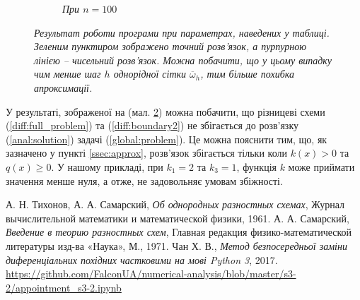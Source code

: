\begin{figure}[h!]
\begin{subfigure}{.5\textwidth}
  \caption{\it При \(n = 100\)}
  \label{fig:sub2}
\end{subfigure}
\caption{{\it Результат роботи програми \cite{SourceCode} при параметрах, наведених у таблиці. Зеленим пунктиром зображено точний розв'язок, а пурпурною лінією -- чисельний розв'язок. Можна побачити, що у цьому випадку чим менше шаг \(h\) однорідної сітки \( \overline{\omega}_h\), тим більше похибка апроксимації.}}
\label{fig:res2}
\end{figure}

У результаті, зображеної на (мал. \ref{fig:res2}) можна побачити, що різницеві схеми (\ref{diff:full_problem}) та (\ref{diff:boundary2}) не збігається до розв'язку (\ref{anal:solution}) задачі (\ref{global:problem}). Це можна пояснити тим, що, як зазначено у пункті \ref{ssec:approx}, розв'язок збігається тільки коли \( k(x) > 0\) та \(q(x) \geq 0\). У нашому прикладі, при \( k_1 = 2\) та  \( k_3 = 1\), функція \(k\) може приймати значення менше нуля, а отже, не задовольняє умовам збіжності.

\begin{thebibliography}{9}

  А. Н. Тихонов, А. А. Самарский,
  \emph{Об однородных разностных схемах},
  Журнал вычислительной математики и математической физики, 1961.
  А. А. Самарский,
  \emph{Введение в теорию разностных схем},
  Главная редакция физико-математической литературы изд-ва «Наука», 
  М., 1971. 
  Чан Х. В., \emph{Метод безпосередньої заміни диференціальних похідних частковими на мові Python 3}, 2017. 
  \url{https://github.com/FalconUA/numerical-analysis/blob/master/s3-2/appointment_s3-2.ipynb}

\end{thebibliography}
